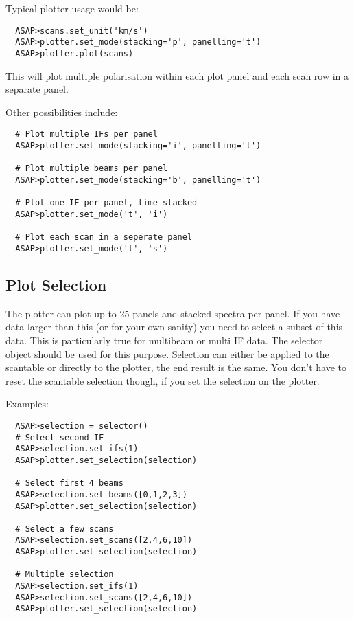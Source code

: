 \documentclass[11pt]{article}
\begin{document}
Typical plotter usage would be:

\begin{verbatim}
  ASAP>scans.set_unit('km/s')
  ASAP>plotter.set_mode(stacking='p', panelling='t')
  ASAP>plotter.plot(scans)
\end{verbatim}

This will plot multiple polarisation within each plot panel and each
scan row in a separate panel.

Other possibilities include:

\begin{verbatim}
  # Plot multiple IFs per panel
  ASAP>plotter.set_mode(stacking='i', panelling='t')

  # Plot multiple beams per panel
  ASAP>plotter.set_mode(stacking='b', panelling='t')

  # Plot one IF per panel, time stacked
  ASAP>plotter.set_mode('t', 'i')

  # Plot each scan in a seperate panel
  ASAP>plotter.set_mode('t', 's')

\end{verbatim}

\subsection{Plot Selection}
\label{sec:plotter_cursor}

The plotter can plot up to 25 panels and
stacked spectra per panel. If you have data larger than this (or for
your own sanity) you need to select a subset of this data. This is
particularly true for multibeam or multi IF data. The selector object
should be used for this purpose. Selection can either be applied to
the scantable or directly to the plotter, the end result is the same.
You don't have to reset the scantable selection though, if you set
the selection on the plotter.

Examples:

\begin{verbatim}
  ASAP>selection = selector()
  # Select second IF
  ASAP>selection.set_ifs(1)
  ASAP>plotter.set_selection(selection)

  # Select first 4 beams
  ASAP>selection.set_beams([0,1,2,3])
  ASAP>plotter.set_selection(selection)

  # Select a few scans
  ASAP>selection.set_scans([2,4,6,10])
  ASAP>plotter.set_selection(selection)

  # Multiple selection
  ASAP>selection.set_ifs(1)
  ASAP>selection.set_scans([2,4,6,10])
  ASAP>plotter.set_selection(selection)

\end{verbatim}
\end{document}
